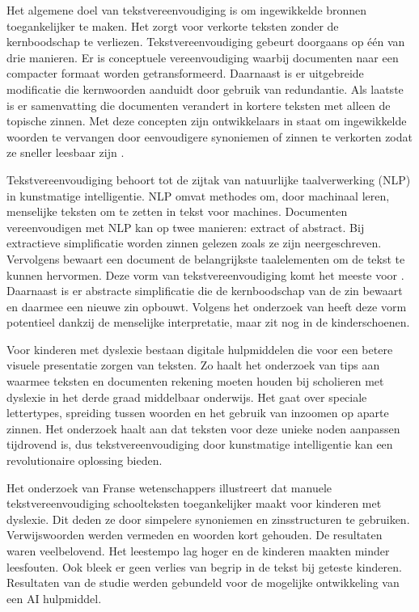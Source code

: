 Het algemene doel van tekstvereenvoudiging is om ingewikkelde bronnen toegankelijker te maken. Het zorgt voor verkorte teksten zonder de kernboodschap te verliezen. Tekstvereenvoudiging gebeurt doorgaans op één van drie manieren. Er is conceptuele vereenvoudiging waarbij documenten naar een compacter formaat worden getransformeerd. Daarnaast is er uitgebreide modificatie die kernwoorden aanduidt door gebruik van redundantie. Als laatste is er samenvatting die documenten verandert in kortere teksten met alleen de topische zinnen. Met deze concepten zijn ontwikkelaars in staat om ingewikkelde woorden te vervangen door eenvoudigere synoniemen of zinnen te verkorten zodat ze sneller leesbaar zijn \autocite{Siddharthan2014}.

Tekstvereenvoudiging behoort tot de zijtak van natuurlijke taalverwerking (NLP) in kunstmatige intelligentie. NLP omvat methodes om, door machinaal leren, menselijke teksten om te zetten in tekst voor machines. Documenten vereenvoudigen met NLP kan op twee manieren: extract of abstract. Bij extractieve simplificatie worden zinnen gelezen zoals ze zijn neergeschreven. Vervolgens bewaart een document de belangrijkste taalelementen om de tekst te kunnen hervormen. Deze vorm van tekstvereenvoudiging komt het meeste voor \autocite{Sciforce2020}. Daarnaast is er abstracte simplificatie die de kernboodschap van de zin bewaart en daarmee een nieuwe zin opbouwt. Volgens het onderzoek van \textcite{Chowdhary2020} heeft deze vorm potentieel dankzij de menselijke interpretatie, maar zit nog in de kinderschoenen.

Voor kinderen met dyslexie bestaan digitale hulpmiddelen die voor een betere visuele presentatie zorgen van teksten. Zo haalt het onderzoek van \textcite{Rello2012} tips aan waarmee teksten en documenten rekening moeten houden bij scholieren met dyslexie in het derde graad middelbaar onderwijs. Het gaat over speciale lettertypes, spreiding tussen woorden en het gebruik van inzoomen op aparte zinnen. Het onderzoek haalt aan dat teksten voor deze unieke noden aanpassen tijdrovend is, dus tekstvereenvoudiging door kunstmatige intelligentie kan een revolutionaire oplossing bieden. 

Het onderzoek van Franse wetenschappers \newline \textcite{Gala2016} illustreert dat manuele tekstvereenvoudiging schoolteksten toegankelijker \newline maakt voor kinderen met dyslexie. Dit deden ze door simpelere synoniemen en zinsstructuren te gebruiken. Verwijswoorden werden vermeden en woorden kort gehouden. De resultaten waren veelbelovend. Het leestempo lag hoger en de kinderen maakten minder leesfouten. Ook bleek er geen verlies van begrip in de tekst bij geteste kinderen. Resultaten van de studie werden gebundeld voor de mogelijke ontwikkeling van een AI hulpmiddel.

